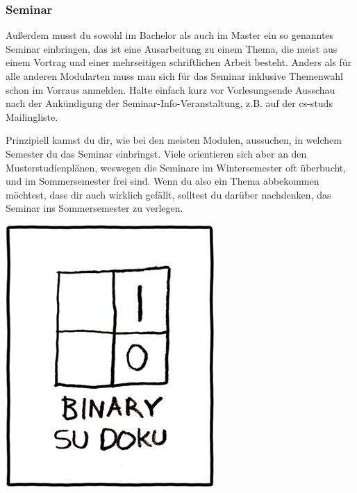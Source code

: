 	\subsubsection{Seminar}
	Außerdem musst du sowohl im Bachelor als auch im Master ein so genanntes Seminar einbringen, das ist eine Ausarbeitung zu einem Thema, die meist aus einem Vortrag und einer mehrseitigen schriftlichen Arbeit besteht. Anders als für alle anderen Modularten muss man sich für das Seminar inklusive Themenwahl schon im Vorraus anmelden. Halte einfach kurz vor Vorlesungsende Ausschau nach der Ankündigung der Seminar-Info-Veranstaltung, z.B. auf der cs-studs Mailingliste.

	Prinzipiell kannst du dir, wie bei den meisten Modulen, aussuchen, in welchem Semester du das Seminar einbringst. Viele orientieren sich aber an den Musterstudienplänen, weswegen die Seminare im Wintersemester oft überbucht, und im Sommersemester frei sind. Wenn du also ein Thema abbekommen möchtest, dass dir auch wirklich gefällt, solltest du darüber nachdenken, das Seminar ins Sommersemester zu verlegen.

	\vspace{0.5cm}
\begin{center}
	\includegraphics[totalheight=6cm]{bilder/XKCD/su_doku}
\end{center}

